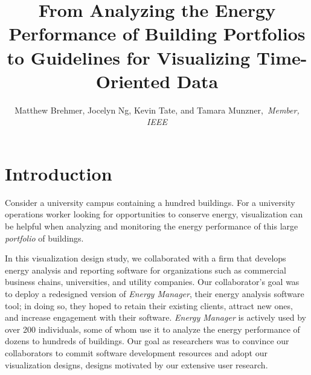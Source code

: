 \documentclass[journal]{vgtc}                %
\title{From Analyzing the Energy Performance of Building Portfolios to Guidelines for Visualizing Time-Oriented Data}
\author{Matthew Brehmer, Jocelyn Ng, Kevin Tate, and Tamara Munzner,~\textit{Member, IEEE}}
\begin{document}

\maketitle



\section{Introduction}
\label{introduction}


Consider a university campus containing a hundred buildings. 
For a university operations worker looking for opportunities to conserve energy, visualization can be helpful when analyzing and monitoring the energy performance of this large {\it portfolio} of buildings. 

In this visualization design study, we collaborated with a firm that develops energy analysis and reporting software for organizations such as commercial business chains, universities, and utility companies.
Our collaborator's goal was to deploy a redesigned version of {\it Energy Manager}, their energy analysis software tool; in doing so, they hoped to retain their existing clients, attract new ones, and increase engagement with their software. 
{\it Energy Manager} is actively used by over 200 individuals, some of whom use it to analyze the energy performance of dozens to hundreds of buildings.
Our goal as researchers was to convince our collaborators to commit software development resources and adopt our visualization designs, designs motivated by our extensive user research.
\end{document}
